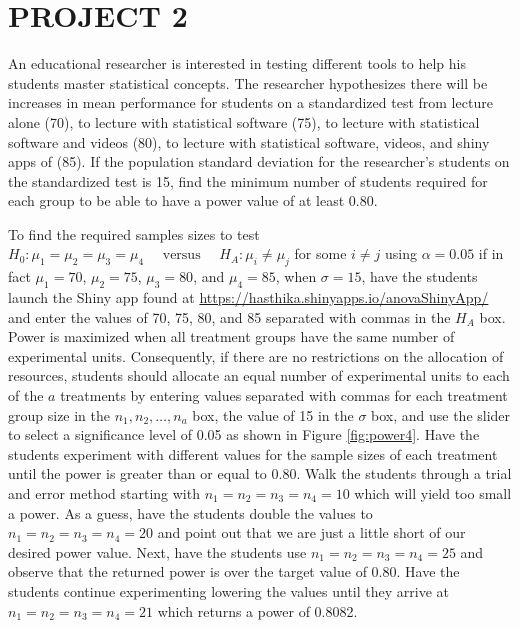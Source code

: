 \documentclass[
]{article}
\begin{document}
\section*{PROJECT 2}\label{project-2}

An educational researcher is interested in testing different tools to help his students master statistical concepts. The researcher hypothesizes there will be increases in mean performance for students on a standardized test from lecture alone (70), to lecture with statistical software (75), to lecture with statistical software and videos (80), to lecture with statistical software, videos, and shiny apps of (85). If the population standard deviation for the researcher's students on the standardized test is 15, find the minimum number of students required for each group to be able to have a power value of at least 0.80.

To find the required samples sizes to test \(H_0: \mu_1 = \mu_2 = \mu_3 = \mu_4 \quad\text{ versus }\quad H_A: \mu_i \neq \mu_j\) for some \(i \neq j\) using \(\alpha = 0.05\) if in fact \(\mu_1 = 70\), \(\mu_2 = 75\), \(\mu_3 = 80\), and \(\mu_4 = 85\), when \(\sigma = 15\), have the students launch the Shiny app found at \url{https://hasthika.shinyapps.io/anovaShinyApp/} and enter the values of 70, 75, 80, and 85 separated with commas in the \(H_A\) box. Power is maximized when all treatment groups have the same number of experimental units. Consequently, if there are no restrictions on the allocation of resources, students should allocate an equal number of experimental units to each of the \(a\) treatments by entering values separated with commas for each treatment group size in the \(n_1, n_2,\ldots, n_a\) box, the value of 15 in the \(\sigma\) box, and use the slider to select a significance level of 0.05 as shown in Figure \ref{fig:power4}. Have the students experiment with different values for the sample sizes of each treatment until the power is greater than or equal to 0.80. Walk the students through a trial and error method starting with \(n_1 = n_2 = n_3 = n_4 = 10\) which will yield too small a power. As a guess, have the students double the values to \(n_1 = n_2 = n_3 = n_4 = 20\) and point out that we are just a little short of our desired power value. Next, have the students use \(n_1 = n_2 = n_3 = n_4 = 25\) and observe that the returned power is over the target value of 0.80. Have the students continue experimenting lowering the values until they arrive at \(n_1 = n_2 = n_3 = n_4 = 21\) which returns a power of 0.8082.
\end{document}
